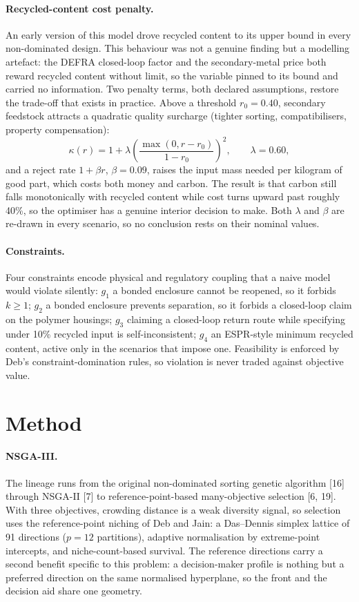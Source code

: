 \documentclass[11pt,a4paper]{article}
\begin{document}
\paragraph{Recycled-content cost penalty.} An early version of this
model drove recycled content to its upper bound in every non-dominated design.
This behaviour was not a genuine finding but a modelling artefact: the DEFRA closed-loop factor and the
secondary-metal price both reward recycled content without limit, so the
variable pinned to its bound and carried no information. Two penalty terms,
both declared assumptions, restore the trade-off that exists in practice.
Above a threshold $r_0 = 0.40$, secondary feedstock attracts a quadratic
quality surcharge (tighter sorting, compatibilisers, property compensation):
\begin{equation}
\kappa(r) = 1 + \lambda \left(\frac{\max(0, r - r_0)}{1 - r_0}\right)^2,
\qquad \lambda = 0.60,
\end{equation}
and a reject rate $1 + \beta r$, $\beta = 0.09$, raises the input mass needed
per kilogram of good part, which costs both money and carbon. The result is
that carbon still falls monotonically with recycled content while cost turns
upward past roughly 40\%, so the optimiser has a genuine interior decision to
make. Both $\lambda$ and $\beta$ are re-drawn in every scenario, so no
conclusion rests on their nominal values.

\paragraph{Constraints.} Four constraints encode physical and regulatory
coupling that a naive model would violate silently:
$g_1$ a bonded enclosure cannot be reopened, so it forbids $k \ge 1$;
$g_2$ a bonded enclosure prevents separation, so it forbids a closed-loop
claim on the polymer housings;
$g_3$ claiming a closed-loop return route while specifying under 10\% recycled
input is self-inconsistent;
$g_4$ an ESPR-style minimum recycled content, active only in the scenarios
that impose one. Feasibility is enforced by Deb's constraint-domination rules,
so violation is never traded against objective value.

\FloatBarrier
\section{Method}

\paragraph{NSGA-III.} The lineage runs from the original non-dominated
sorting genetic algorithm [16] through NSGA-II [7] to reference-point-based
many-objective selection [6, 19]. With three objectives, crowding distance is
a weak diversity signal, so selection uses the reference-point niching of Deb
and Jain: a Das--Dennis simplex lattice of 91 directions
($p=12$ partitions), adaptive
normalisation by extreme-point intercepts, and niche-count-based survival.
The reference directions carry a second benefit specific to this problem: a
decision-maker profile is nothing but a preferred direction on the same
normalised hyperplane, so the front and the decision aid share one geometry.
\end{document}
